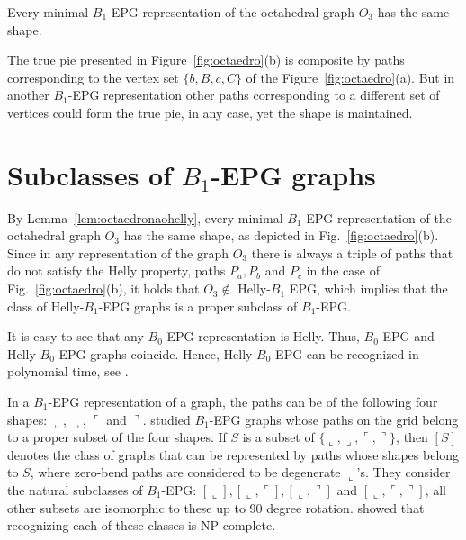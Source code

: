 \begin{lemma}\label{lem:octaedronaohelly}
Every minimal $B_1$-EPG representation of the octahedral graph $O_3$ has the same shape.
\end{lemma}

 


The true pie presented in Figure~\ref{fig:octaedro}(b) is composite by paths corresponding to the vertex set $\{b, B, c, C\}$ of the Figure~\ref{fig:octaedro}(a). But in another $B_1$-EPG representation other paths corresponding to a different set of vertices could form the true pie, in any case, yet the shape is maintained. 



\section{Subclasses of $B_1$-EPG graphs}


By Lemma~\ref{lem:octaedronaohelly}, every minimal $B_1$-EPG representation of the octahedral graph $O_3$ has the same shape, as depicted in Fig.~\ref{fig:octaedro}(b). 
Since in any representation of the graph $O_3$ there is always a triple of paths that do not satisfy the Helly property, paths $P_{a}, P_{b} $ and $P_{c}$ in the case of Fig.~\ref{fig:octaedro}(b), it holds that $O_3 \notin$ Helly-$B_1$ EPG, which implies that the class of Helly-$B_1$-EPG graphs is a proper subclass of $B_1$-EPG.

It is easy to see that any $B_0$-EPG representation is Helly. Thus, $B_0$-EPG and Helly-$B_0$-EPG graphs coincide.  Hence, Helly-$B_0$ EPG can be recognized in polynomial time, see \cite{booth1976}.

In a $B_1$-EPG representation of a graph, the paths can be of the following four shapes: $\llcorner$, $\lrcorner$, $\ulcorner$ and $\urcorner$. \citet{cameron2016edge} studied $B_1$-EPG graphs whose paths on the grid belong to a proper subset of the four shapes. If $S$ is a subset of $\{\llcorner, \lrcorner, \ulcorner, \urcorner\}$, then $[S]$ denotes the class of graphs that can be represented by paths whose shapes belong to $S$, where zero-bend paths are considered to be degenerate $\llcorner$'s. They consider the natural subclasses of $B_1$-EPG: $[\llcorner], [\llcorner, \ulcorner], [\llcorner, \urcorner]$ and $[\llcorner, \ulcorner, \urcorner]$, all other subsets are isomorphic
to these up to 90 degree rotation. \cite{cameron2016edge}  showed that recognizing each of these classes is NP-complete.

